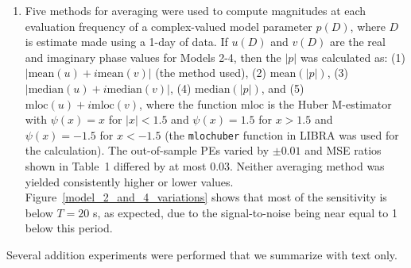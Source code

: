 \documentclass[draft,linenumbers]{agujournal2018}
\begin{document}
\begin{enumerate}
\item Five methods for averaging were used to compute magnitudes at each evaluation frequency of a complex-valued model parameter $p(D)$, where $D$ is estimate made using a 1-day of data. If $u(D)$ and $v(D)$ are the real and imaginary phase values for Models 2-4, then the $|p|$ was calculated as: (1) $|\text{mean}(u)+i\text{mean}(v)|$ (the method used), (2) $\text{mean}(|p|)$, (3) $|\text{median}(u)+i\text{median}(v)|$, (4) $\text{median}(|p|)$, and (5) $\text{mloc}(u) + i\text{mloc}(v)$, where the function $\text{mloc}$ is the Huber M-estimator \citep{Huber2011} with $\psi(x)=x$ for $|x|<1.5$ and $\psi(x) = 1.5$ for $x>1.5$ and $\psi(x) = -1.5$ for $x<-1.5$ (the \texttt{mlochuber} function in LIBRA \citep{Verboven2010} was used for the calculation). The out-of-sample PEs varied by $\pm 0.01$ and MSE ratios shown in Table~1 differed by at most $0.03$. Neither averaging method was yielded consistently higher or lower values. Figure~\ref{model_2_and_4_variations} shows that most of the sensitivity is below $T=20$ s, as expected, due to the signal-to-noise being near equal to 1 below this period.

\end{enumerate}

Several addition experiments were performed that we summarize with text only.
\end{document}
